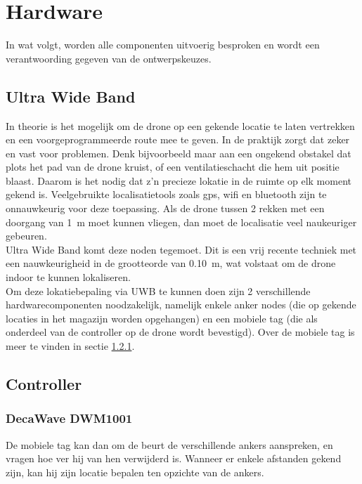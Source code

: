\chapter{Hardware}
In wat volgt, worden alle componenten uitvoerig besproken en wordt een verantwoording gegeven van de ontwerpskeuzes.

\section{Ultra Wide Band}  \label{sec:uwb}
In theorie is het mogelijk om de drone op een gekende locatie te laten vertrekken en een voorgeprogrammeerde route mee te geven. In de praktijk zorgt dat zeker en vast voor problemen. Denk bijvoorbeeld maar aan een ongekend obstakel dat plots het pad van de drone kruist, of een ventilatieschacht die hem uit positie blaast. Daarom is het nodig dat z'n precieze lokatie in de ruimte op elk moment gekend is. Veelgebruikte localisatietools zoals gps, wifi en bluetooth zijn te onnauwkeurig voor deze toepassing. Als de drone tussen 2 rekken met een doorgang van \SI{1}{\m} moet kunnen vliegen, dan moet de localisatie veel naukeuriger gebeuren.\\

Ultra Wide Band komt deze noden tegemoet. Dit is een vrij recente techniek met een nauwkeurigheid in de grootteorde van \SI{0.10}{\m}, wat volstaat om de drone indoor te kunnen lokaliseren.\\

Om deze lokatiebepaling via UWB te kunnen doen zijn 2 verschillende hardwarecomponenten noodzakelijk, namelijk enkele anker nodes (die op gekende locaties in het magazijn worden opgehangen) en een mobiele tag (die als onderdeel van de controller op de drone wordt bevestigd). Over de mobiele tag is meer te vinden in sectie \ref{sec:decawave}.

\section{Controller} \label{sec:controller}
\subsection{DecaWave DWM1001}  \label{sec:decawave}
De mobiele tag kan dan om de beurt de verschillende ankers aanspreken, en vragen hoe ver hij van hen verwijderd is. Wanneer er enkele afstanden gekend zijn, kan hij zijn locatie bepalen ten opzichte van de ankers.\\

